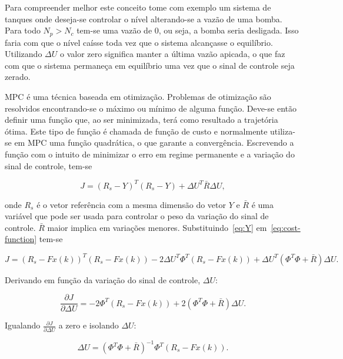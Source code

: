 Para compreender melhor este conceito tome com exemplo um sistema de tanques
onde deseja-se controlar o nível alterando-se a vazão de uma bomba. Para todo
\( N_p > N_c \) tem-se uma vazão de 0, ou seja, a bomba seria desligada. Isso
faria com que o nível caísse toda vez que o sistema alcançasse o equilíbrio.
Utilizando \( \Delta{}U \) o valor zero significa manter a última vazão apicada,
o que faz com que o sistema permaneça em equilíbrio uma vez que o sinal de
controle seja zerado.

MPC é uma técnica baseada em otimização. Problemas de otimização são resolvidos
encontrando-se o máximo ou mínimo de alguma função. Deve-se então definir uma
função que, ao ser minimizada, terá como resultado a trajetória ótima. Este tipo
de função é chamada de função de custo e normalmente utiliza-se em \ac{MPC} uma
função quadrática, o que garante a convergência. Escrevendo a função com o
intuito de minimizar o erro em regime permanente e a variação do sinal de
controle, tem-se

\begin{equation}
	\label{eq:cost-function}
	J = {(R_s - Y)}^T(R_s-Y) + \Delta{}U^T\bar{R}\Delta{}U,
\end{equation}

onde \( R_s \) é o vetor referência com a mesma dimensão do vetor \( Y \) e
\(\bar{R} \) é uma variável que pode ser usada para controlar o peso da variação
do sinal de controle. \( \bar{R} \) maior implica em variações menores.
Substituindo~\eqref{eq:Y} em~\eqref{eq:cost-function} tem-se

\begin{equation}
	J = {(R_s-Fx(k))}^T(R_s-Fx(k))-2\Delta{}U^T\Phi^T(R_s-Fx(k))+\Delta{}U^T(\Phi^T\Phi+\bar{R})\Delta{}U.
\end{equation}

Derivando em função da variação do sinal de controle, \( \Delta{}U \):

\begin{equation}
	\frac{\partial{}J}{\partial{}\Delta{}U} = -2\Phi^T(R_s-Fx(k))+2(\Phi^T\Phi+\bar{R})\Delta{}U.
\end{equation}

Igualando \( \frac{\partial{}J}{\partial{}\Delta{}U} \) a zero e isolando \(
\Delta{}U \):

\begin{equation}
	\label{eq:delta-u}
	\Delta{}U = {(\Phi^T\Phi+\bar{R})}^{-1}\Phi^T(R_s-Fx(k)).
\end{equation}

